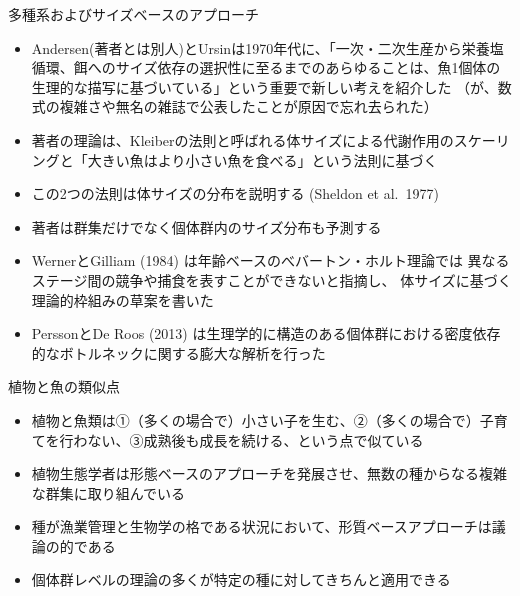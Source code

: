 \documentclass[
  ignorenonframetext,
]{beamer}
\providecommand{\tightlist}{%
  \setlength{\itemsep}{0pt}\setlength{\parskip}{0pt}}
\newcommand{\vspacelarge}{\vspace{6mm}}
\begin{document}
\begin{frame}{多種系およびサイズベースのアプローチ}
\protect\hypertarget{ux591aux7a2eux7cfbux304aux3088ux3073ux30b5ux30a4ux30baux30d9ux30fcux30b9ux306eux30a2ux30d7ux30edux30fcux30c1}{}

\begin{itemize}[<+->]
\tightlist
\item
  Andersen(著者とは別人)とUrsinは1970年代に、「一次・二次生産から栄養塩循環、餌へのサイズ依存の選択性に至るまでのあらゆることは、魚1個体の生理的な描写に基づいている」という重要で新しい考えを紹介した
  （が、数式の複雑さや無名の雑誌で公表したことが原因で忘れ去られた）\\
\item
  著者の理論は、Kleiberの法則と呼ばれる体サイズによる代謝作用のスケーリングと「大きい魚はより小さい魚を食べる」という法則に基づく
\item
  この2つの法則は体サイズの分布を説明する (Sheldon et al.~1977) 
\item
  著者は群集だけでなく個体群内のサイズ分布も予測する 
\item
  WernerとGilliam (1984) は年齢ベースのべバートン・ホルト理論では
  異なるステージ間の競争や捕食を表すことができないと指摘し、
  体サイズに基づく理論的枠組みの草案を書いた\\
\item
  PerssonとDe Roos (2013)
  は生理学的に構造のある個体群における密度依存的なボトルネックに関する膨大な解析を行った
\end{itemize}

\end{frame}

\begin{frame}{植物と魚の類似点}
\protect\hypertarget{ux690dux7269ux3068ux9b5aux306eux985eux4f3cux70b9}{}

\begin{itemize}
\tightlist
\item
  植物と魚類は①（多くの場合で）小さい子を生む、②（多くの場合で）子育てを行わない、③成熟後も成長を続ける、という点で似ている\\
  \vspacelarge
\item
  植物生態学者は形態ベースのアプローチを発展させ、無数の種からなる複雑な群集に取り組んでいる\\
  \vspacelarge
\item
  種が漁業管理と生物学の格である状況において、形質ベースアプローチは議論の的である
  \vspacelarge
\item
  個体群レベルの理論の多くが特定の種に対してきちんと適用できる
\end{itemize}

\end{frame}
\end{document}
